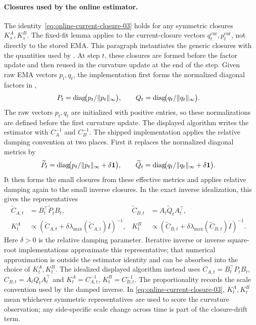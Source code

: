 \paragraph{Closures used by the online estimator.}
The identity~\eqref{eq:online-current-closure-03} holds for any symmetric
closures $K^A_s,K^B_s$. The fixed-fit lemma applies to the current-closure
vectors $q^{\mathrm{cur}}_t,p^{\mathrm{cur}}_t$, not directly to the stored EMA.
This paragraph instantiates the generic closures with the quantities used by
. At step $t$, these closures are formed before the factor update
and then reused in the curvature update at the end of the step. Given raw EMA
vectors $p_t,q_t$, the implementation first forms the normalized diagonal
factors in ,
\[
  P_t=\operatorname{diag}\!\bigl(p_t/\| p_t\|_\infty\bigr),
  \qquad
  Q_t=\operatorname{diag}\!\bigl(q_t/\| q_t\|_\infty\bigr).
\]
The raw vectors $p_t,q_t$ are initialized with positive entries, so these
normalizations are defined before the first curvature update. The displayed
algorithm writes the estimator with $C_A^{-1}$ and $C_B^{-1}$. The shipped
implementation applies the relative damping convention at two places. First it
replaces the normalized diagonal metrics by
\[
  \widetilde P_t
  =
  \operatorname{diag}\!\bigl(p_t/\| p_t\|_\infty+\delta\mathbf 1\bigr),
  \qquad
  \widetilde Q_t
  =
  \operatorname{diag}\!\bigl(q_t/\| q_t\|_\infty+\delta\mathbf 1\bigr).
\]
It then forms the small closures from these effective metrics and applies
relative damping again to the small inverse closures. In the exact inverse
idealization, this gives the representatives
\[
\begin{aligned}
  \widetilde C_{A,t}&=B_t^\top \widetilde P_tB_t,
  &
  \widetilde C_{B,t}&=A_t\widetilde Q_tA_t^\top,\\
  K^A_t
  &\propto(\widetilde C_{A,t}
    +\delta\lambda_{\max}(\widetilde C_{A,t})I)^{-1},
  &
  K^B_t
  &\propto(\widetilde C_{B,t}
    +\delta\lambda_{\max}(\widetilde C_{B,t})I)^{-1}.
\end{aligned}
\]
Here $\delta>0$ is the relative damping parameter. Iterative inverse or inverse
square-root implementations approximate this representative; that numerical
approximation is outside the estimator identity and can be absorbed into the
choice of $K^A_t,K^B_t$. The idealized displayed algorithm instead uses
$C_{A,t}=B_t^\top P_tB_t$, $C_{B,t}=A_tQ_tA_t^\top$ and
$K^A_t=C_{A,t}^{-1}$, $K^B_t=C_{B,t}^{-1}$. The proportionality records the
scale convention used by the damped inverse. In
\eqref{eq:online-current-closure-03}, $K^A_t,K^B_t$ mean whichever symmetric
representatives are used to score the curvature observation; any side-specific
scale change across time is part of the closure-drift term.

